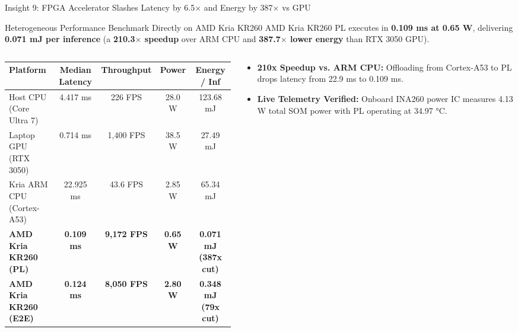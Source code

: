 \documentclass[aspectratio=169, 10pt]{beamer}
\begin{document}
\begin{frame}{Insight 9: FPGA Accelerator Slashes Latency by 6.5$\times$ and Energy by 387$\times$ vs GPU}
  \begin{block}{Heterogeneous Performance Benchmark Directly on AMD Kria KR260}
    AMD Kria KR260 PL executes in \textbf{0.109 ms at 0.65 W}, delivering \textbf{0.071 mJ per inference} (a \textbf{210.3$\times$ speedup} over ARM CPU and \textbf{387.7$\times$ lower energy} than RTX 3050 GPU).
  \end{block}
  \vspace{-0.2cm}
  \begin{columns}[T]
    \begin{column}{0.54\textwidth}
      \setlength{\tabcolsep}{2pt}
      \begin{table}
        \centering
        \scriptsize
        \begin{tabular}{lcccc}
          \toprule
          \textbf{Platform} & \textbf{Median Latency} & \textbf{Throughput} & \textbf{Power} & \textbf{Energy / Inf} \\
          \midrule
          Host CPU (Core Ultra 7) & 4.417 ms & 226 FPS & 28.0 W & 123.68 mJ \\
          Laptop GPU (RTX 3050) & 0.714 ms & 1,400 FPS & 38.5 W & 27.49 mJ \\
          Kria ARM CPU (Cortex-A53) & 22.925 ms & 43.6 FPS & 2.85 W & 65.34 mJ \\
          \textbf{AMD Kria KR260 (PL)} & \textbf{0.109 ms} & \textbf{9,172 FPS} & \textbf{0.65 W} & \textbf{0.071 mJ (387x cut)} \\
          \textbf{AMD Kria KR260 (E2E)}& \textbf{0.124 ms} & \textbf{8,050 FPS} & \textbf{2.80 W} & \textbf{0.348 mJ (79x cut)} \\
          \bottomrule
        \end{tabular}
      \end{table}
    \end{column}
    \begin{column}{0.44\textwidth}
      \begin{itemize}
        \item \textbf{210x Speedup vs. ARM CPU:} Offloading from Cortex-A53 to PL drops latency from 22.9 ms to 0.109 ms.
        \item \textbf{Live Telemetry Verified:} Onboard INA260 power IC measures 4.13 W total SOM power with PL operating at 34.97 °C.
      \end{itemize}
    \end{column}
  \end{columns}
\end{frame}
\end{document}
